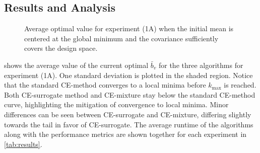 \subsection{Results and Analysis} \label{sec:cem_results}

\begin{figure}[!hb]
  \resizebox{0.9\columnwidth}{!}{}
  \caption{
    \label{fig:experiment_1a}
    Average optimal value for experiment (1A) when the initial mean is centered at the global minimum and the covariance sufficiently covers the design space.
  }
\end{figure}

 shows the average value of the current optimal $\bar{b}_v$ for the three algorithms for experiment (1A). 
One standard deviation is plotted in the shaded region.
Notice that the standard CE-method converges to a local minima before $k_\text{max}$ is reached.
Both CE-surrogate method and CE-mixture stay below the standard CE-method curve, highlighting the mitigation of convergence to local minima.
Minor differences can be seen between CE-surrogate and CE-mixture, differing slightly towards the tail in favor of CE-surrogate.
The average runtime of the algorithms along with the performance metrics are shown together for each experiment in \cref{tab:results}.


